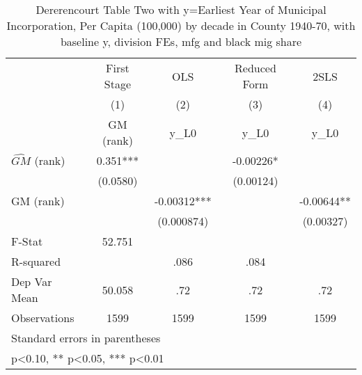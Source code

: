 \begin{table}[htbp]\centering
\def\sym#1{\ifmmode^{#1}\else\(^{#1}\)\fi}
\caption{Dererencourt Table Two with y=Earliest Year of Municipal Incorporation, Per Capita (100,000) by decade in County 1940-70, with baseline y, division FEs, mfg and black mig share}
\begin{tabular}{l*{4}{c}}
\toprule
                    & First Stage   &         OLS   &Reduced Form   &        2SLS   \\
                    &\multicolumn{1}{c}{(1)}&\multicolumn{1}{c}{(2)}&\multicolumn{1}{c}{(3)}&\multicolumn{1}{c}{(4)}\\
                    &\multicolumn{1}{c}{GM  (rank)}&\multicolumn{1}{c}{y\_L0}&\multicolumn{1}{c}{y\_L0}&\multicolumn{1}{c}{y\_L0}\\
\midrule
$\hat{GM}$ (rank)   &       0.351***&               &    -0.00226*  &               \\
                    &    (0.0580)   &               &   (0.00124)   &               \\
\addlinespace
GM  (rank)          &               &    -0.00312***&               &    -0.00644** \\
                    &               &  (0.000874)   &               &   (0.00327)   \\
\midrule
F-Stat              &      52.751   &               &               &               \\
R-squared           &               &        .086   &        .084   &               \\
Dep Var Mean        &      50.058   &         .72   &         .72   &         .72   \\
Observations        &        1599   &        1599   &        1599   &        1599   \\
\bottomrule
\multicolumn{5}{l}{\footnotesize Standard errors in parentheses}\\
\multicolumn{5}{l}{\footnotesize * p<0.10, ** p<0.05, *** p<0.01}\\
\end{tabular}
\end{table}
